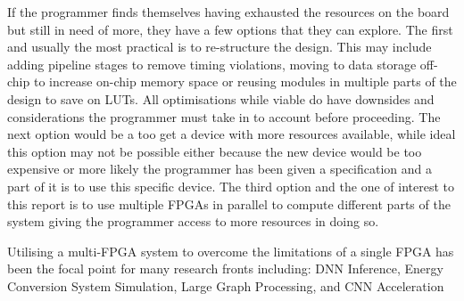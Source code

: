 If the programmer finds themselves having exhausted the resources on the board but still in need of more, they have a few options that they can explore. The first and usually the most practical is to re-structure the design. This may include adding pipeline stages to remove timing violations, moving to data storage off-chip to increase on-chip memory space or reusing modules in multiple parts of the design to save on LUTs. All optimisations while viable do have downsides and considerations the programmer must take in to account before proceeding. The next option would be a too get a device with more resources available, while ideal this option may not be possible either because the new device would be too expensive or more likely the programmer has been given a specification and a part of it is to use this specific device. The third option and the one of interest to this report is to use multiple FPGAs in parallel to compute different parts of the system giving the programmer access to more resources in doing so.

Utilising a multi-FPGA system to overcome the limitations of a single FPGA has been the focal point for many research fronts including: DNN Inference\cite{10.1145/3358192}, Energy Conversion System Simulation\cite{8822485}, Large Graph Processing\cite{10.1145/3020078.3021739}, and CNN Acceleration \cite{10.1145/3337821.3337846}